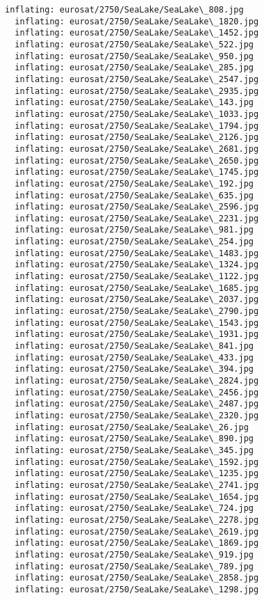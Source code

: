 \documentclass[11pt]{article}
\begin{document}
\begin{Verbatim}[commandchars=\\\{\}]
  inflating: eurosat/2750/SeaLake/SeaLake\_808.jpg
  inflating: eurosat/2750/SeaLake/SeaLake\_1820.jpg
  inflating: eurosat/2750/SeaLake/SeaLake\_1452.jpg
  inflating: eurosat/2750/SeaLake/SeaLake\_522.jpg
  inflating: eurosat/2750/SeaLake/SeaLake\_950.jpg
  inflating: eurosat/2750/SeaLake/SeaLake\_285.jpg
  inflating: eurosat/2750/SeaLake/SeaLake\_2547.jpg
  inflating: eurosat/2750/SeaLake/SeaLake\_2935.jpg
  inflating: eurosat/2750/SeaLake/SeaLake\_143.jpg
  inflating: eurosat/2750/SeaLake/SeaLake\_1033.jpg
  inflating: eurosat/2750/SeaLake/SeaLake\_1794.jpg
  inflating: eurosat/2750/SeaLake/SeaLake\_2126.jpg
  inflating: eurosat/2750/SeaLake/SeaLake\_2681.jpg
  inflating: eurosat/2750/SeaLake/SeaLake\_2650.jpg
  inflating: eurosat/2750/SeaLake/SeaLake\_1745.jpg
  inflating: eurosat/2750/SeaLake/SeaLake\_192.jpg
  inflating: eurosat/2750/SeaLake/SeaLake\_635.jpg
  inflating: eurosat/2750/SeaLake/SeaLake\_2596.jpg
  inflating: eurosat/2750/SeaLake/SeaLake\_2231.jpg
  inflating: eurosat/2750/SeaLake/SeaLake\_981.jpg
  inflating: eurosat/2750/SeaLake/SeaLake\_254.jpg
  inflating: eurosat/2750/SeaLake/SeaLake\_1483.jpg
  inflating: eurosat/2750/SeaLake/SeaLake\_1324.jpg
  inflating: eurosat/2750/SeaLake/SeaLake\_1122.jpg
  inflating: eurosat/2750/SeaLake/SeaLake\_1685.jpg
  inflating: eurosat/2750/SeaLake/SeaLake\_2037.jpg
  inflating: eurosat/2750/SeaLake/SeaLake\_2790.jpg
  inflating: eurosat/2750/SeaLake/SeaLake\_1543.jpg
  inflating: eurosat/2750/SeaLake/SeaLake\_1931.jpg
  inflating: eurosat/2750/SeaLake/SeaLake\_841.jpg
  inflating: eurosat/2750/SeaLake/SeaLake\_433.jpg
  inflating: eurosat/2750/SeaLake/SeaLake\_394.jpg
  inflating: eurosat/2750/SeaLake/SeaLake\_2824.jpg
  inflating: eurosat/2750/SeaLake/SeaLake\_2456.jpg
  inflating: eurosat/2750/SeaLake/SeaLake\_2487.jpg
  inflating: eurosat/2750/SeaLake/SeaLake\_2320.jpg
  inflating: eurosat/2750/SeaLake/SeaLake\_26.jpg
  inflating: eurosat/2750/SeaLake/SeaLake\_890.jpg
  inflating: eurosat/2750/SeaLake/SeaLake\_345.jpg
  inflating: eurosat/2750/SeaLake/SeaLake\_1592.jpg
  inflating: eurosat/2750/SeaLake/SeaLake\_1235.jpg
  inflating: eurosat/2750/SeaLake/SeaLake\_2741.jpg
  inflating: eurosat/2750/SeaLake/SeaLake\_1654.jpg
  inflating: eurosat/2750/SeaLake/SeaLake\_724.jpg
  inflating: eurosat/2750/SeaLake/SeaLake\_2278.jpg
  inflating: eurosat/2750/SeaLake/SeaLake\_2619.jpg
  inflating: eurosat/2750/SeaLake/SeaLake\_1869.jpg
  inflating: eurosat/2750/SeaLake/SeaLake\_919.jpg
  inflating: eurosat/2750/SeaLake/SeaLake\_789.jpg
  inflating: eurosat/2750/SeaLake/SeaLake\_2858.jpg
  inflating: eurosat/2750/SeaLake/SeaLake\_1298.jpg

\end{Verbatim}
\end{document}
